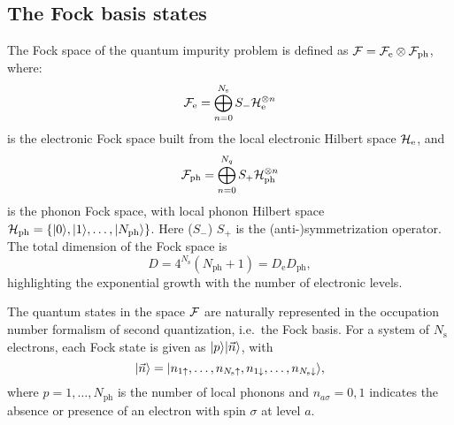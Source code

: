 \documentclass[edipack_sp.tex]{subfiles}
\begin{document}
\subsection{The Fock basis states}\label{sSecBasis}
The Fock space of the quantum impurity problem is defined as
${\cal F}={\cal F}_\mathrm{e}\otimes {\cal F}_\mathrm{ph}$, where: $$
{\cal F}_\mathrm{e}=\bigoplus_{n=0}^{N_\mathrm{s}}
S_-{\cal H}_\mathrm{e}^{\otimes n}
$$ 
is the electronic Fock space built 
from the local electronic Hilbert space ${\cal H}_\mathrm{e}$, and 
$$
{\cal F}_\mathrm{ph}=\bigoplus_{n=0}^{N_q}S_+{\cal H}_\mathrm{ph}^{\otimes n}
$$
is the
phonon Fock space, with local phonon Hilbert space
${\cal H}_\mathrm{ph}=\{|0\rangle,|1\rangle,\dots,|N_\mathrm{ph}\rangle\}$. 
Here ($S_-$) $S_+$ is the (anti-)symmetrization operator.  
%
The total dimension of the Fock space is
$$
D=4^{N_\mathrm{s}} (N_\mathrm{ph}+1)=D_\mathrm{e}D_\mathrm{ph},
$$ 
highlighting the exponential
growth with the number of electronic levels. 

The quantum states in the space ${\cal F}$ are naturally represented in
the occupation number formalism of second quantization,
i.e.~the Fock basis.
For a system of $N_\mathrm{s}$ electrons, each Fock state
is given as $|p\rangle|\vec{n}\rangle$, with
\begin{equation} \label{eq:FockState_|nupndw>}
    |\vec{n}\rangle=|n_{1\uparrow},\dots,n_{N_\mathrm{s}\uparrow},n_{1\downarrow},\dots,n_{N_\mathrm{s}\downarrow}\rangle,
\end{equation}
where $p=1,\dots,N_\mathrm{ph}$ is the number of local phonons and
$n_{a\sigma}=0,1$ indicates the absence or 
presence of an electron with spin $\sigma$ at level $a$.
\end{document}
